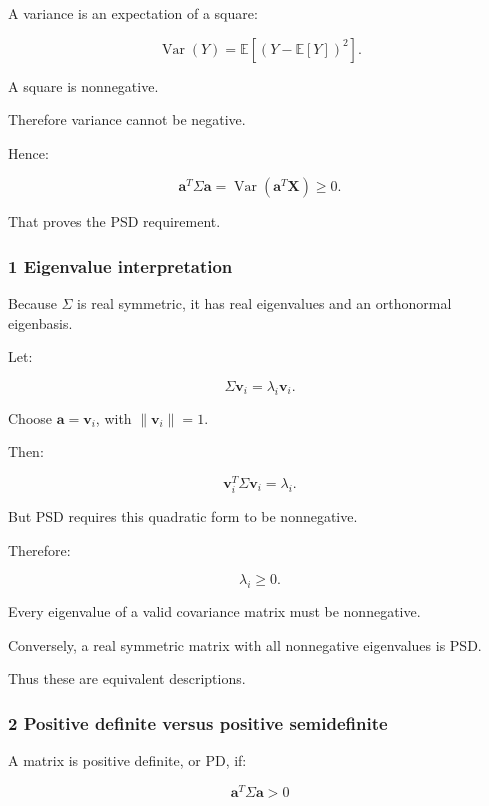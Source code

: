 A variance is an expectation of a square:

\[
 \operatorname{Var}(Y) = \mathbb E[(Y-\mathbb E[Y])^2].
\]

A square is nonnegative.

Therefore variance cannot be negative.

Hence:

\[
 \boxed{ \mathbf a^T\Sigma\mathbf a = \operatorname{Var}(\mathbf a^T\mathbf X) \ge0 }.
\]

That proves the PSD requirement.

\subsubsection{1 Eigenvalue interpretation}\label{02-foundations-ii-ch024-eigenvalue-interpretation}

\hypertarget{02-foundations-ii-ch024-eigenvalue-interpretation}{}

Because \(\Sigma\) is real symmetric, it has real eigenvalues and an orthonormal eigenbasis.

Let:

\[
 \Sigma\mathbf v_i=\lambda_i\mathbf v_i.
\]

Choose \(\mathbf a=\mathbf v_i\), with \(\|\mathbf v_i\|=1\).

Then:

\[
 \mathbf v_i^T\Sigma\mathbf v_i = \lambda_i.
\]

But PSD requires this quadratic form to be nonnegative.

Therefore:

\[
 \boxed{\lambda_i\ge0}.
\]

Every eigenvalue of a valid covariance matrix must be nonnegative.

Conversely, a real symmetric matrix with all nonnegative eigenvalues is PSD.

Thus these are equivalent descriptions.

\subsubsection{2 Positive definite versus positive semidefinite}\label{02-foundations-ii-ch024-positive-definite-versus-positive-semidefinite}

\hypertarget{02-foundations-ii-ch024-positive-definite-versus-positive-semidefinite}{}

A matrix is positive definite, or PD, if:

\[
 \mathbf a^T\Sigma\mathbf a>0
\]

